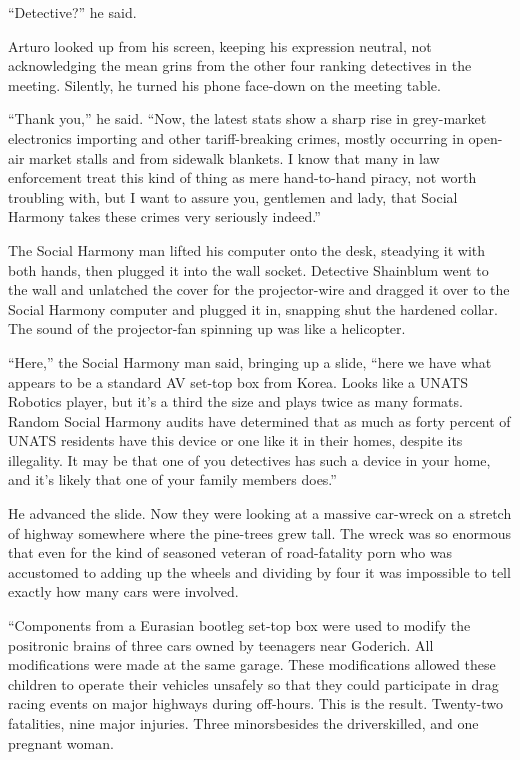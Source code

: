 “Detective?” he said.

Arturo looked up from his screen, keeping his expression neutral,
not acknowledging the mean grins from the other four ranking
detectives in the meeting. Silently, he turned his phone face-down
on the meeting table.

“Thank you,” he said. “Now, the latest stats show a sharp rise in
grey-market electronics importing and other tariff-breaking crimes,
mostly occurring in open-air market stalls and from sidewalk
blankets. I know that many in law enforcement treat this kind of
thing as mere hand-to-hand piracy, not worth troubling with, but I
want to assure you, gentlemen and lady, that Social Harmony takes
these crimes very seriously indeed.”

The Social Harmony man lifted his computer onto the desk, steadying
it with both hands, then plugged it into the wall socket. Detective
Shainblum went to the wall and unlatched the cover for the
projector-wire and dragged it over to the Social Harmony computer
and plugged it in, snapping shut the hardened collar. The sound of
the projector-fan spinning up was like a helicopter.

“Here,” the Social Harmony man said, bringing up a slide, “here we
have what appears to be a standard AV set-top box from Korea. Looks
like a UNATS Robotics player, but it’s a third the size and plays
twice as many formats. Random Social Harmony audits have determined
that as much as forty percent of UNATS residents have this device
or one like it in their homes, despite its illegality. It may be
that one of you detectives has such a device in your home, and it’s
likely that one of your family members does.”

He advanced the slide. Now they were looking at a massive car-wreck
on a stretch of highway somewhere where the pine-trees grew tall.
The wreck was so enormous that even for the kind of seasoned
veteran of road-fatality porn who was accustomed to adding up the
wheels and dividing by four it was impossible to tell exactly how
many cars were involved.

“Components from a Eurasian bootleg set-top box were used to modify
the positronic brains of three cars owned by teenagers near
Goderich. All modifications were made at the same garage. These
modifications allowed these children to operate their vehicles
unsafely so that they could participate in drag racing events on
major highways during off-hours. This is the result. Twenty-two
fatalities, nine major injuries. Three minors{\dash}besides the
drivers{\dash}killed, and one pregnant woman.

